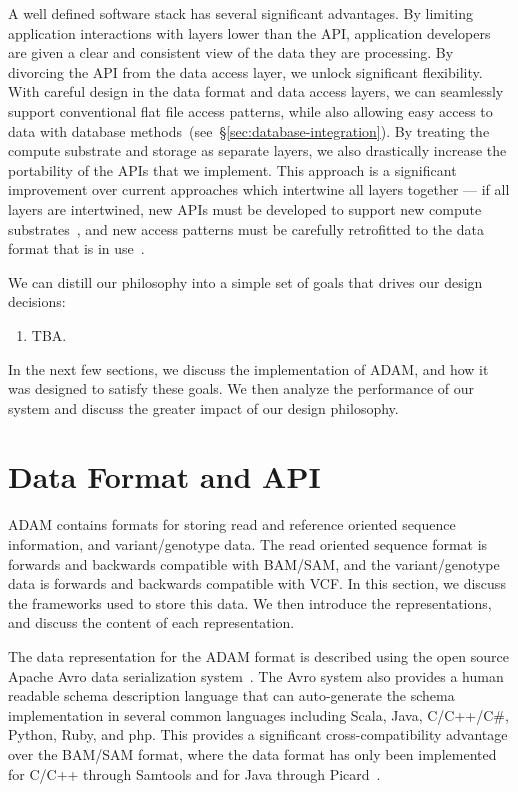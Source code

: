 \documentclass[10pt,twocolumn]{article}
\begin{document}
A well defined software stack has several significant advantages. By limiting application interactions with layers lower than the API,
application developers are given a clear and consistent view of the data they are processing. By divorcing the API from the data
access layer, we unlock significant flexibility. With careful design in the data format and data access layers, we can seamlessly
support conventional flat file access patterns, while also allowing easy access to data with database
methods~(see~\S\ref{sec:database-integration}). By treating the compute substrate and storage as separate layers, we also
drastically increase the portability of the APIs that we implement. This approach is a significant improvement over current approaches
which intertwine all layers together --- if all layers are intertwined, new APIs must be developed to support new compute
substrates~\cite{niemenmaa12}, and new access patterns must be carefully retrofitted to the data format that is in use~\cite{kozanitis13}.

We can distill our philosophy into a simple set of goals that drives our design decisions:

\begin{enumerate}
\item TBA.
\end{enumerate}

In the next few sections, we discuss the implementation of ADAM, and how it was designed to satisfy these goals. We then
analyze the performance of our system and discuss the greater impact of our design philosophy.

\section{Data Format and API}
\label{sec:data-format-and-api}

ADAM contains formats for storing read and reference oriented sequence information, and variant/genotype data.
The read oriented sequence format is forwards and backwards compatible with BAM/SAM, and the variant/genotype
data is forwards and backwards compatible with VCF. In this section, we discuss the frameworks used to store this
data. We then introduce the representations, and discuss the content of each representation.

The data representation for the ADAM format is described using the open source Apache Avro data serialization
system~\cite{avro}. The Avro system also provides a human readable schema description language that can
auto-generate the schema implementation in several common languages including Scala, Java, C/C++/C\#,
Python, Ruby, and php. This provides a significant cross-compatibility advantage over the BAM/SAM format,
where the data format has only been implemented for C/C++ through Samtools and for Java through
Picard~\cite{li09,picard}.
\end{document}
